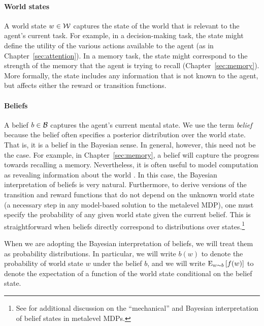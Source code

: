 \paragraph{World states}
A world state $w \in \W$ captures the state of the world that is relevant to the agent's current task. For example, in a decision-making task, the state might define the utility of the various actions available to the agent (as in Chapter~\ref{sec:attention}). In a memory task, the state might correspond to the strength of the memory that the agent is trying to recall (Chapter~\ref{sec:memory}). More formally, the state includes any information that is not known to the agent, but affects either the reward or transition functions.

\paragraph{Beliefs}
A belief $b \in \B$ captures the agent's current mental state. We use the term \emph{belief} because the belief often specifies a posterior distribution over the world state. That is, it is a belief in the Bayesian sense. In general, however, this need not be the case. For example, in Chapter~\ref{sec:memory}, a belief will capture the progress towards recalling a memory. Nevertheless, it is often useful to model computation as revealing information about the world \citep{matheson1968economic}. In this case, the Bayesian interpretation of beliefs is very natural. Furthermore, to derive versions of the transition and reward functions that do not depend on the unknown world state (a necessary step in any model-based solution to the metalevel MDP), one must specify the probability of any given world state given the current belief. This is straightforward when beliefs directly correspond to distributions over states.\footnote{See \citet[Chapter~7]{hay2016principles} for additional discussion on the ``mechanical'' and Bayesian interpretation of belief states in metalevel MDPs.}

When we are adopting the Bayesian interpretation of beliefs, we will treat them as probability distributions. In particular, we will write $b(w)$ to denote the probability of world state $w$ under the belief $b$, and we will write $\expectunder{f(w)}{w \sim b}$ to denote the expectation of a function of the world state conditional on the belief state.


